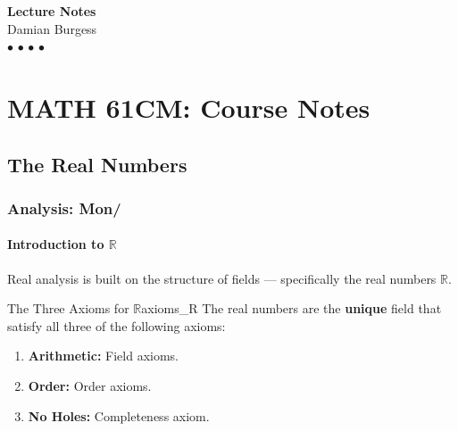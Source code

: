 \documentclass[11pt, letterpaper, openany]{book}
\newcommand{\makeMagicCover}[2]{
    \begin{titlepage}
        \pagecolor{MagicTeal} 
        \color{MagicCream}
        \vspace*{2in}
        \begin{center}
            {\fontsize{50}{60}\selectfont \sffamily\bfseries #1} \\[1em]
            {\fontsize{20}{25}\selectfont \sffamily #2} \\[3in]
            {\color{MagicPink}\Huge $\bullet$} \quad 
            {\color{MagicMint}\Huge $\bullet$} \quad 
            {\color{MagicPeach}\Huge $\bullet$} \quad 
            {\color{MagicBlue}\Huge $\bullet$}
        \end{center}
    \end{titlepage}
    \pagecolor{MagicCream} 
}
\begin{document}
\makeMagicCover{Lecture Notes}{Damian Burgess}

{
  \hypersetup{linkcolor=MagicTeal}
  \tableofcontents
}

\part{MATH 61CM: Course Notes}

\chapter{The Real Numbers}

\section{Analysis: Mon/}

\subsection{Introduction to $\mathbb{R}$}
Real analysis is built on the structure of fields — specifically the real numbers $\mathbb{R}$.

\begin{defn}{The Three Axioms for $\mathbb{R}$}{axioms_R}
The real numbers are the \textbf{unique} field that satisfy all three of the following axioms:
\begin{enumerate}
    \item \textbf{Arithmetic:} Field axioms.
    \item \textbf{Order:} Order axioms.
    \item \textbf{No Holes:} Completeness axiom.
\end{enumerate}
\end{defn}
\end{document}

